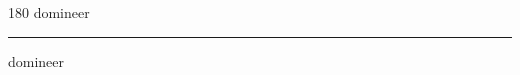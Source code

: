
\begin{frame}
\begin{center}
\begin{turn}{180}
{\fontsize{2.5cm}{1em}\selectfont domineer}
\end{turn}
\vspace{1em}\par  
\hrule
\vspace{1em}\par  
{\fontsize{2.5cm}{1em}\selectfont domineer}
\end{center}
\end{frame}
